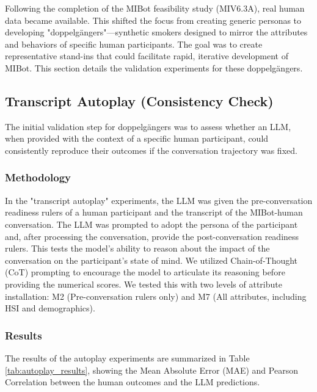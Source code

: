 Following the completion of the MIBot feasibility study (MIV6.3A), real human data became available. This shifted the focus from creating generic personas to developing "doppelgängers"—synthetic smokers designed to mirror the attributes and behaviors of specific human participants. The goal was to create representative stand-ins that could facilitate rapid, iterative development of MIBot. This section details the validation experiments for these doppelgängers.

\subsection{Transcript Autoplay (Consistency Check)}

The initial validation step for doppelgängers was to assess whether an LLM, when provided with the context of a specific human participant, could consistently reproduce their outcomes if the conversation trajectory was fixed.

\subsubsection{Methodology}

In the "transcript autoplay" experiments, the LLM was given the pre-conversation readiness rulers of a human participant and the transcript of the MIBot-human conversation. The LLM was prompted to adopt the persona of the participant and, after processing the conversation, provide the post-conversation readiness rulers. This tests the model's ability to reason about the impact of the conversation on the participant's state of mind. We utilized Chain-of-Thought (CoT) prompting to encourage the model to articulate its reasoning before providing the numerical scores. We tested this with two levels of attribute installation: M2 (Pre-conversation rulers only) and M7 (All attributes, including HSI and demographics).

\subsubsection{Results}

The results of the autoplay experiments are summarized in Table \ref{tab:autoplay_results}, showing the Mean Absolute Error (MAE) and Pearson Correlation between the human outcomes and the LLM predictions.

